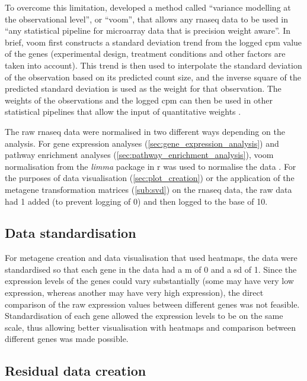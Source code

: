 To overcome this limitation, \citet{Law2014} developed a method called ``variance modelling at the observational level'', or ``voom'', that allows any \gls{rnaseq} data to be used in ``any statistical pipeline for microarray data that is precision weight aware''.
In brief, voom first constructs a standard deviation trend from the logged \gls{cpm} value of the genes (experimental design, treatment conditions and other factors are taken into account).
This trend is then used to interpolate the standard deviation of the observation based on its predicted count size, and the inverse square of the predicted standard deviation is used as the weight  for that observation.
The weights of the observations and the logged \gls{cpm} can then be used in other statistical pipelines that allow the input of quantitative weights \citep{Law2014}.

The raw \gls{rnaseq} data were normalised in two different ways depending on the analysis.
For gene expression analyses (\cref{sec:gene_expression_analysis}) and pathway enrichment analyses (\cref{sec:pathway_enrichment_analysis}), voom normalisation from the \textit{limma} package in \gls{r} was used to normalise the data \citep{Ritchie2015}.
For the purposes of data visualisation (\cref{sec:plot_creation}) or the application of the metagene transformation matrices (\cref{sub:svd}) on the \gls{rnaseq} data, the raw data had 1 added (to prevent logging of 0) and then logged to the base of 10.

\subsection{Data standardisation}
\label{sub:data_standardisation}

For metagene creation and data visualisation that used heatmaps, the data were standardised so that each gene in the data had a \gls{m} of 0 and a \gls{sd} of 1.
Since the expression levels of the genes could vary substantially (some may have very low expression, whereas another may have very high expression), the direct comparison of the raw expression values between different genes was not feasible.
Standardisation of each gene allowed the expression levels to be on the same scale, thus allowing better visualisation with heatmaps and comparison between different genes was made possible.

\subsection{Residual data creation}
\label{sub:residual_data_creation}

